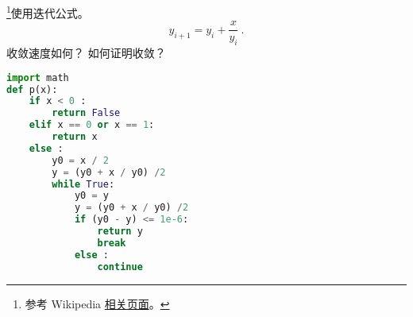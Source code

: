 
\begin{issues}
\issueDraft
\end{issues}

\footnote{参考 Wikipedia \href{https://en.wikipedia.org/wiki/Methods_of_computing_square_roots}{相关页面}。}使用迭代公式。
\begin{equation}
y_{i+1} = y_i + \frac{x}{y_i}~.
\end{equation}
收敛速度如何？ 如何证明收敛？

\begin{lstlisting}[language=python]
import math
def p(x):
    if x < 0 :
        return False
    elif x == 0 or x == 1:
        return x
    else :
        y0 = x / 2
        y = (y0 + x / y0) /2
        while True:
            y0 = y
            y = (y0 + x / y0) /2
            if (y0 - y) <= 1e-6:
                return y
                break
            else :
                continue
\end{lstlisting}
